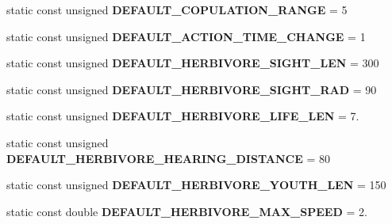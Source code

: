 \begin{DoxyCompactItemize}
\item 
\hypertarget{class_constants_a94a0cf9d9d99fad762313f9fe4cce423}{}static const unsigned {\bfseries D\+E\+F\+A\+U\+L\+T\+\_\+\+C\+O\+P\+U\+L\+A\+T\+I\+O\+N\+\_\+\+R\+A\+N\+G\+E} = 5\label{class_constants_a94a0cf9d9d99fad762313f9fe4cce423}

\item 
\hypertarget{class_constants_af0ca0f46fcb00cd54983ac55bdafce5f}{}static const unsigned {\bfseries D\+E\+F\+A\+U\+L\+T\+\_\+\+A\+C\+T\+I\+O\+N\+\_\+\+T\+I\+M\+E\+\_\+\+C\+H\+A\+N\+G\+E} = 1\label{class_constants_af0ca0f46fcb00cd54983ac55bdafce5f}

\item 
\hypertarget{class_constants_a02716f531d908811ca35e5342f7aec13}{}static const unsigned {\bfseries D\+E\+F\+A\+U\+L\+T\+\_\+\+H\+E\+R\+B\+I\+V\+O\+R\+E\+\_\+\+S\+I\+G\+H\+T\+\_\+\+L\+E\+N} = 300\label{class_constants_a02716f531d908811ca35e5342f7aec13}

\item 
\hypertarget{class_constants_a194285e97c44e7b438556aa591b7574e}{}static const unsigned {\bfseries D\+E\+F\+A\+U\+L\+T\+\_\+\+H\+E\+R\+B\+I\+V\+O\+R\+E\+\_\+\+S\+I\+G\+H\+T\+\_\+\+R\+A\+D} = 90\label{class_constants_a194285e97c44e7b438556aa591b7574e}

\item 
\hypertarget{class_constants_a9c07bd51d6dfabf246ab5ce50cd94043}{}static const unsigned {\bfseries D\+E\+F\+A\+U\+L\+T\+\_\+\+H\+E\+R\+B\+I\+V\+O\+R\+E\+\_\+\+L\+I\+F\+E\+\_\+\+L\+E\+N} = 7.\label{class_constants_a9c07bd51d6dfabf246ab5ce50cd94043}

\item 
\hypertarget{class_constants_acd6349f03c7c755e1ce546b0285f69f5}{}static const unsigned {\bfseries D\+E\+F\+A\+U\+L\+T\+\_\+\+H\+E\+R\+B\+I\+V\+O\+R\+E\+\_\+\+H\+E\+A\+R\+I\+N\+G\+\_\+\+D\+I\+S\+T\+A\+N\+C\+E} = 80\label{class_constants_acd6349f03c7c755e1ce546b0285f69f5}

\item 
\hypertarget{class_constants_af26aebe02d8a6c1de9c35aee9a157f30}{}static const unsigned {\bfseries D\+E\+F\+A\+U\+L\+T\+\_\+\+H\+E\+R\+B\+I\+V\+O\+R\+E\+\_\+\+Y\+O\+U\+T\+H\+\_\+\+L\+E\+N} = 150\label{class_constants_af26aebe02d8a6c1de9c35aee9a157f30}

\item 
\hypertarget{class_constants_a527305f73c2b7c85f198efbf80d29ea8}{}static const double {\bfseries D\+E\+F\+A\+U\+L\+T\+\_\+\+H\+E\+R\+B\+I\+V\+O\+R\+E\+\_\+\+M\+A\+X\+\_\+\+S\+P\+E\+E\+D} = 2.\label{class_constants_a527305f73c2b7c85f198efbf80d29ea8}


\end{DoxyCompactItemize}
